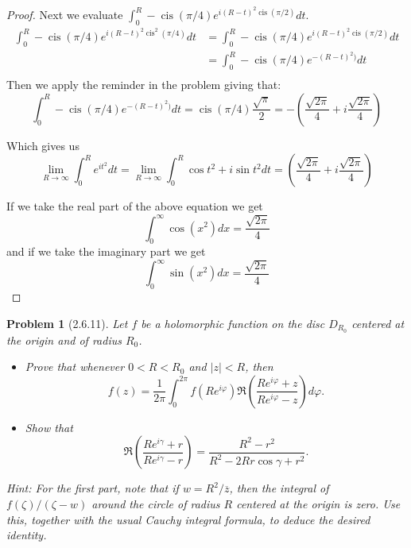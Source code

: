 \documentclass[10pt]{article}
\newcommand{\sk}{\vskip 10mm}
\newcommand{\conj}[1]{\overline{#1}}
\DeclareMathOperator{\cis}{cis}
\theoremstyle{plain}
\newtheorem{problem}{Problem}
\theoremstyle{remark}
\begin{document}
\begin{proof}
  Next we evaluate $\int_0^R-\cis(\pi/4)e^{i(R-t)^2\cis(\pi/2)}dt$.
  \begin{align*}
    \int_0^R-\cis(\pi/4)e^{i(R-t)^2\cis^2(\pi/4)} dt &= \int_0^R-\cis(\pi/4)e^{i(R-t)^2\cis(\pi/2)}dt\\
                                              &= \int_0^R-\cis(\pi/4)e^{-(R-t)^2)}dt\\
  \end{align*}
  Then we apply the reminder in the problem giving that:
  \[
    \int_0^R-\cis(\pi/4)e^{-(R-t)^2)}dt = \cis(\pi/4)\frac{\sqrt{\pi}}{2}=-\left(\frac{\sqrt{2\pi}}{4}+i\frac{\sqrt{2\pi}}{4}\right)
  \]

  Which gives us
  \[
    \lim_{R\rightarrow\infty}\int_0^R e^{it^2}dt=\lim_{R\rightarrow\infty}\int_0^R\cos t^2+i\sin t^2 dt = \left(\frac{\sqrt{2\pi}}{4}+i\frac{\sqrt{2\pi}}{4}\right)
  \]

  If we take the real part of the above equation we get
  \[
    \int_0^\infty\cos(x^2)dx=\frac{\sqrt{2\pi}}{4}
  \]
  and if we take the imaginary part we get
  \[
    \int_0^\infty\sin(x^2)dx=\frac{\sqrt{2\pi}}{4}
  \]
\end{proof}

\sk

\begin{problem}[2.6.11]
  Let $f$ be a holomorphic function on the disc $D_{R_0}$ centered at the
  origin and of radius $R_0$.
  \begin{itemize}
  \item[(a)] Prove that whenever $0<R<R_0$ and $|z|<R$, then
    \[
      f(z)=\frac{1}{2\pi}\int_0^{2\pi}f(Re^{i\varphi})\Re\left(\frac{Re^{i\varphi}+z}{Re^{i\varphi}-z}\right)d\varphi.
    \]
  \item[(b)] Show that
    \[
      \Re\left(\frac{Re^{i\gamma}+r}{Re^{i\gamma}-r}\right) = \frac{R^2-r^2}{R^2-2Rr\cos\gamma + r^2}.
    \]
  \end{itemize}
  Hint: For the first part, note that if $w=R^2/\conj{z}$, then the integral of
  $f(\zeta)/(\zeta-w)$ around the circle of radius $R$ centered at the origin is
  zero. Use this, together with the usual Cauchy integral formula, to deduce
  the desired identity.
\end{problem}
\end{document}
